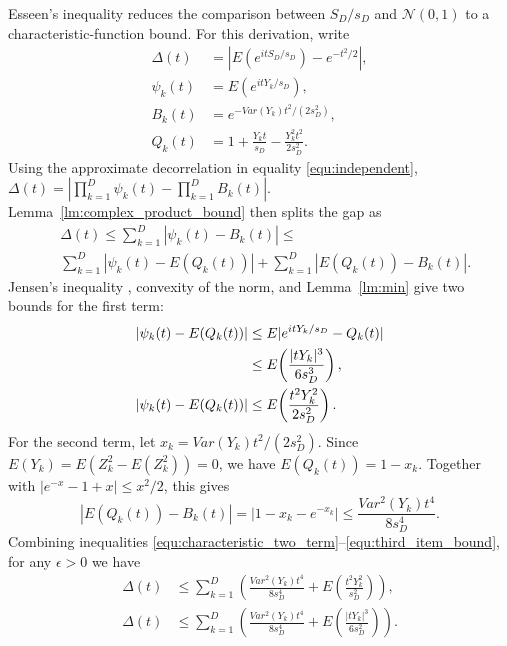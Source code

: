 Esseen's inequality reduces the comparison between $S_D/s_D$ and $\mathcal{N}(0,1)$ to a characteristic-function bound. For this derivation, write
\begin{align}
\Delta(t)&=\left|E(e^{itS_D/s_D})-e^{-t^2/2}\right|,\label{equ:delta_notation}\\
\psi_k(t)&=E(e^{itY_k/s_D}),\label{equ:psi_k_notation}\\
B_k(t)&=e^{-Var(Y_k)t^2/(2s_D^2)},\label{equ:Bk_notation}\\
Q_k(t)&=1+\frac{Y_kt}{s_D}-\frac{Y_k^2t^2}{2s_D^2}.\label{equ:Qk_notation}
\end{align}
Using the approximate decorrelation in equality \ref{equ:independent}, $\Delta(t)=|\prod_{k=1}^{D}\psi_k(t)-\prod_{k=1}^{D}B_k(t)|$. Lemma~\ref{lm:complex_product_bound} then splits the gap as
\begin{equation}
\begin{aligned}
&\Delta(t)\leq \sum_{k=1}^{D}|\psi_k(t)-B_k(t)| \leq {}\\
&\sum_{k=1}^{D}|\psi_k(t)-E(Q_k(t))|
+\sum_{k=1}^{D}|E(Q_k(t))-B_k(t)|.
\end{aligned}
\label{equ:characteristic_two_term}
\end{equation}
Jensen's inequality \cite{mcshane1937jensen}, convexity of the norm, and Lemma~\ref{lm:min} give two bounds for the first term:
\begin{align}
|\psi_k(t)-E(Q_k(t))|
&\leq E|e^{itY_k/s_D}-Q_k(t)| \notag\\
&\leq E\!\left(\frac{|tY_k|^3}{6s_D^3}\right),
\label{equ:first_item_bound}\\
|\psi_k(t)-E(Q_k(t))|
&\leq E\!\left(\frac{t^2Y_k^2}{2s_D^2}\right).
\label{equ:second_item_bound}
\end{align}
For the second term, let $x_k=Var(Y_k)t^2/(2s_D^2)$. Since $E(Y_k)=E(Z_k^2-E(Z_k^2))=0$, we have $E(Q_k(t))=1-x_k$. Together with $|e^{-x}-1+x|\leq x^2/2$, this gives
\begin{equation}
|E(Q_k(t))-B_k(t)|
=|1-x_k-e^{-x_k}|
\leq \frac{Var^2(Y_k)t^4}{8s_D^4}.
\label{equ:third_item_bound}
\end{equation}
Combining inequalities \ref{equ:characteristic_two_term}--\ref{equ:third_item_bound}, for any $\epsilon>0$ we have
\begin{align}
\Delta(t)
&\leq
\sum_{k=1}^{D}\left(
\frac{Var^2(Y_k)t^4}{8s_D^4}
+E\!\left(\frac{t^2Y_k^2}{s_D^2}\right)
\right),
\label{equ:inequ_1}\\
\Delta(t)
&\leq
\sum_{k=1}^{D}\left(
\frac{Var^2(Y_k)t^4}{8s_D^4}
+E\!\left(\frac{|tY_k|^3}{6s_D^2}\right)
\right).
\label{equ:inequ_2}
\end{align}
